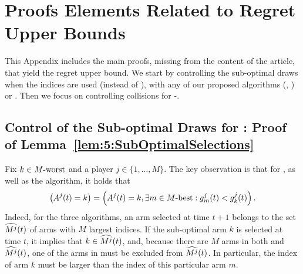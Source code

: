 
\section{Proofs Elements Related to Regret Upper Bounds}
\label{proof:5:RegretUpperBounds}

This Appendix includes the main proofs, missing from the content of the article,
that yield the regret upper bound.
We start by controlling the sub-optimal draws when the \klUCB{} indices are used (instead of \UCB),
with any of our proposed algorithms (\MCTopM, \RandTopM) or \rhoRand{}. Then we focus on controlling collisions for \MCTopM-\klUCB.

\subsection{Control of the Sub-optimal Draws for \klUCB: Proof of Lemma~\ref{lem:5:SubOptimalSelections}}
\label{proof:5:SubOptimalSelections}

%
%
Fix $k\in M\text{-}\mathrm{worst}$ and a player $j \in \{1,\dots,M\}$.
The key observation is that for \MCTopM, \RandTopM{} as well as the \rhoRand{} algorithm, it holds that
\begin{equation}\left(A^j(t) = k\right) = \left(A^j(t) = k , \exists m \in M\text{-}\mathrm{best} : g_m^j(t) < g_k^j(t) \right).\label{eq:5:KeyInclusion}\end{equation}
Indeed, for the three algorithms, an arm selected at time $t+1$ belongs to the set $\widehat{M^j}(t)$ of arms with $M$ largest indices.
If the sub-optimal arm $k$ is selected at time $t$, it implies that $k \in \widehat{M^j}(t)$, and, because there are $M$ arms in both \Mbest{} and $\widehat{M^j}(t)$, one of the arms in \Mbest{} must be excluded from $\widehat{M^j}(t)$.
In particular, the index of arm $k$ must be larger than the index of this particular arm $m$.



